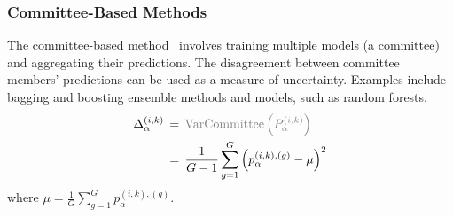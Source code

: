 \subsubsection{Committee-Based Methods}
The committee-based method~\cite{wang_Wisdom_2020} involves training multiple models (a committee) and aggregating their predictions. The disagreement between committee members' predictions can be used as a measure of uncertainty. Examples include bagging and boosting ensemble methods and models, such as random forests.
\begin{align}
    \Delta_{\alpha}^{(i,k)}
    \, & = \, \textcolor{gray}{\mathrm{VarCommittee}\left(P_{\alpha}^{(i,k)}\right)} \\
    \, & = \, \frac{1}{G-1} \sum_{g=1}^G {\left(p_{\alpha}^{(i,k),(g)}-\mu\right)}^{2}
    \label{eq:crowd.Eq.8.uncertainty.committee_based}
\end{align}
where $\mu= \frac{1}{G} \sum_{g=1}^G p_{\alpha}^{(i,k),(g)}$.


